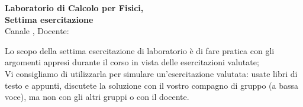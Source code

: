 \documentclass[11pt]{article}
\begin{document}
\pagestyle{empty}

\begin{center}
{\Large \bf  Laboratorio di Calcolo per Fisici,\\ Settima esercitazione \\[2mm]}
{\large Canale \canale, Docente: \docente}
\end{center}
\vspace{4mm}

\begin{mdframed}[backgroundcolor=gray!10]
Lo scopo della settima esercitazione di laboratorio è di fare pratica con
gli argomenti appresi durante il corso in vista delle esercitazioni valutate;\\
Vi consigliamo di utilizzarla per simulare un'esercitazione valutata: usate libri di testo e appunti,
discutete la soluzione con il vostro compagno di gruppo (a bassa voce), ma non con gli altri gruppi o con il docente.
  \end{mdframed}
%
%
\end{document}
